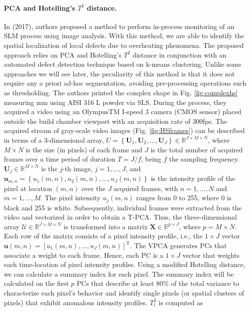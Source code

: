\paragraph{PCA and Hotelling's $T^2$ distance.} In \citeauthor{grasso_-process_2017} (2017), authors proposed a method to perform in-process monitoring of an SLM process using image analysis. With this method, we are able to identify the spatial localization of local defects due to overheating phenomena. The proposed approach relies on PCA and Hotelling's $T^2$ distance in conjunction with an automated defect detection technique based on k-means clustering. Unlike some approaches we will see later, the peculiarity of this method is that it does not require any a priori ad-hoc segmentation, avoiding pre-processing operations such as thresholding. The authors printed the complex shape in Fig. \ref{fig:complexhs} measuring  \unit{\milli\metre} using AISI 316 L powder via SLS. During the process, they acquired a video using an OlympusTM I-speed 3 camera (CMOS sensor) placed outside the build chamber viewport with an acquisition rate of 300fps. The acquired stream of gray-scale video images (Fig. \ref{fig:HSframes}) can be described in terms of a 3-dimensional array, $U=\left\{\boldsymbol{U}_1, \boldsymbol{U}_2, \ldots, \boldsymbol{U}_J\right\} \in \mathbb{R}^{J \times M \times N}$, where $M \times N$ is the size (in pixels) of each frame and $J$ is the total number of acquired frames over a time period of duration $T=J / f$, being $f$ the sampling frequency. $\boldsymbol{U}_j \in \mathbb{R}^{M \times N}$ is the $j$-th image, $j=1, \ldots, J$, and $\boldsymbol{u}_{m, n}=\left\{u_1(m,n), u_2(m, n), \ldots, u_J(m,n)\right\}$ is the intensity profile of the pixel at location $(m, n)$ over the $J$ acquired frames, with $n=1, \ldots, N$ and $m=1, \ldots, M$. The pixel intensity $u_j(m,n)$ ranges from 0 to 255, where 0 is black and 255 is white. Subsequently, individual frames were extracted from the video and vectorized in order to obtain a T-PCA. Thus, the three-dimensional array $\mathcal{U} \in \mathbb{R}^{J \times M \times N}$ is transformed into a matrix $\mathbf{X} \in \mathbb{R}^{p \times J}$, where $p=M \times N$. Each row of the matrix consists of a pixel intensity profile, i.e., the $1 \times J$ vector $\boldsymbol{u}(m, n)=\left[u_1(m, n), \ldots, u_J(m, n)\right]^{\mathrm{T}}$. The VPCA generates PCs that associate a weight to each frame. Hence, each PC is a $1 \times J$ vector that weights each time-location of pixel intensity profiles. Using a modified Hotelling distance, we can calculate a summary index for each pixel. The summary index will be calculated on the first $p$ PCs that describe at least 80\% of the total variance to characterize each pixel's behavior and identify single pixels (or spatial clusters of pixels) that exhibit anomalous intensity profiles. $T_l^2$ is computed as

